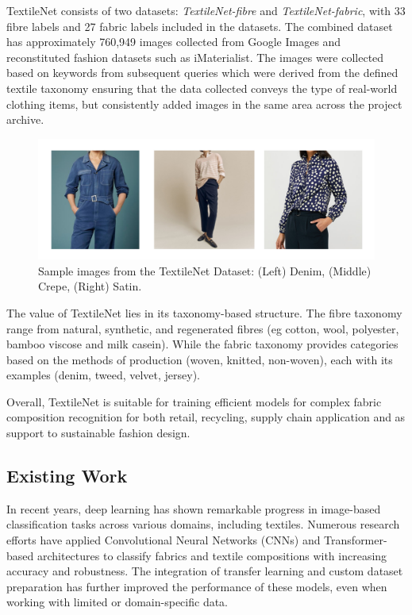 TextileNet consists of two datasets: \textit{TextileNet-fibre} and \textit{TextileNet-fabric}, with 33 fibre labels and 27 fabric labels included in the datasets. The combined dataset has approximately 760,949 images collected from Google Images and reconstituted fashion datasets such as iMaterialist. The images were collected based on keywords from subsequent queries which were derived from the defined textile taxonomy ensuring that the data collected conveys the type of real-world clothing items, but consistently added images in the same area across the project archive.

\begin{figure}[H]
    \centering
    \begin{minipage}{0.8\linewidth}
        \includegraphics[width=\linewidth]{images/TextileNetDataset.png}
    \end{minipage}
    \caption[Sample images from the TextileNet Dataset]{Sample images from the TextileNet Dataset: (Left) Denim, (Middle) Crepe, (Right) Satin.}
\end{figure}

The value of TextileNet lies in its taxonomy-based structure. The fibre taxonomy range from natural, synthetic, and regenerated fibres (eg cotton, wool, polyester, bamboo viscose and milk casein). While the fabric taxonomy provides categories based on the methods of production (woven, knitted, non-woven), each with its examples (denim, tweed, velvet, jersey).

Overall, TextileNet is suitable for training efficient models for complex fabric composition recognition for both retail, recycling, supply chain application and as support to sustainable fashion design.

\subsection{Existing Work}

In recent years, deep learning has shown remarkable progress in image-based classification tasks across various domains, including textiles. Numerous research efforts have applied Convolutional Neural Networks (CNNs) and Transformer-based architectures to classify fabrics and textile compositions with increasing accuracy and robustness. The integration of transfer learning and custom dataset preparation has further improved the performance of these models, even when working with limited or domain-specific data.

